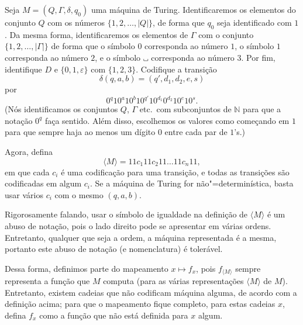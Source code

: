 \begin{definition}
    Seja $M = (Q, \Gamma, \delta, q_0)$ uma máquina de Turing.
    Identificaremos os elementos do conjunto $Q$
    com os números $\{1, 2, \dots, |Q|\}$,
    de forma que $q_0$ seja identificado com $1$.
    Da mesma forma,
    identificaremos os elementos de $\Gamma$
    com o conjunto $\{1, 2, \dots, |\Gamma|\}$
    de forma que o símbolo $0$ corresponda ao número $1$,
    o símbolo $1$ corresponda ao número $2$,
    e o símbolo $\B$ corresponda ao número $3$.
    Por fim, identifique $D$ e $\{0, 1, \varepsilon\}$ com $\{1, 2, 3\}$.
    Codifique a transição
    \begin{equation*}
        \delta(q, a, b) = (q', d_1, d_2, e, s)
    \end{equation*}
    por
    \begin{equation*}
        0^q 1 0^a 1 0^b 1 0^{q'} 1 0^{d_1} 0^{d_2} 1 0^e 1 0^s.
    \end{equation*}
    (Nós identificamos os conjuntos $Q$, $\Gamma$ etc.\ com subconjuntos de $\mathbb N$
    para que a notação $0^q$ faça sentido.
    Além disso,
    escolhemos os valores como começando em $1$
    para que sempre haja ao menos um dígito $0$ entre cada par de $1$'s.)

    Agora,
    defina
    \begin{equation*}
        \langle M \rangle = 11 c_1 11 c_2 11 \dots 11 c_n 11,
    \end{equation*}
    em que cada $c_i$ é uma codificação para uma transição,
    e todas as transições são codificadas em algum $c_i$.
    Se a máquina de Turing for não"=determinística,
    basta usar vários $c_i$ com o mesmo $(q, a, b)$.
\end{definition}

Rigorosamente falando,
usar o símbolo de igualdade na definição de $\langle M \rangle$
é um abuso de notação,
pois o lado direito pode se apresentar em várias ordens.
Entretanto,
qualquer que seja a ordem,
a máquina representada é a mesma,
portanto este abuso de notação (e nomenclatura) é tolerável.

Dessa forma,
definimos parte do mapeamento $x \mapsto f_x$,
pois $f_{\langle M \rangle}$ sempre representa a função que $M$ computa
(para as várias representações $\langle M \rangle$ de $M$).
Entretanto,
existem cadeias que não codificam máquina alguma,
de acordo com a definição acima;
para que o mapeamento fique completo,
para estas cadeias $x$,
defina $f_x$ como a função que não está definida para $x$ algum.


